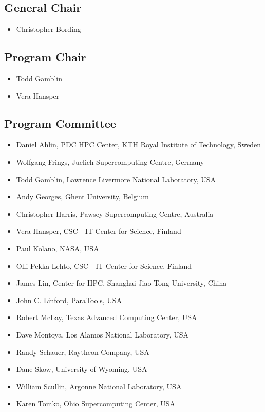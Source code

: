 \documentclass[11pt,a4paper]{article}
\begin{document}
\subsection{General Chair}
\begin{itemize}
\item Christopher Bording
\end{itemize}
\subsection{Program Chair}

\begin{itemize}
\item Todd Gamblin
\item Vera Hansper
\end{itemize}

\subsection{Program Committee}

\begin{itemize}
\item Daniel Ahlin, PDC HPC Center, KTH Royal Institute of Technology, Sweden
\item Wolfgang Frings, Juelich Supercomputing Centre, Germany
\item Todd Gamblin, Lawrence Livermore National Laboratory, USA
\item Andy Georges, Ghent University, Belgium
\item Christopher Harris, Pawsey Supercomputing Centre, Australia
\item Vera Hansper, CSC - IT Center for Science, Finland
\item Paul Kolano, NASA, USA
\item Olli-Pekka Lehto, CSC - IT Center for Science, Finland
\item James Lin, Center for HPC, Shanghai Jiao Tong University, China
\item John C. Linford, ParaTools, USA
\item Robert McLay, Texas Advanced Computing Center, USA
\item Dave Montoya, Los Alamos National Laboratory, USA
\item Randy Schauer, Raytheon Company, USA
\item Dane Skow, University of Wyoming, USA
\item William Scullin, Argonne National Laboratory, USA
\item Karen Tomko, Ohio Supercomputing Center, USA
\end{itemize}
\end{document}
